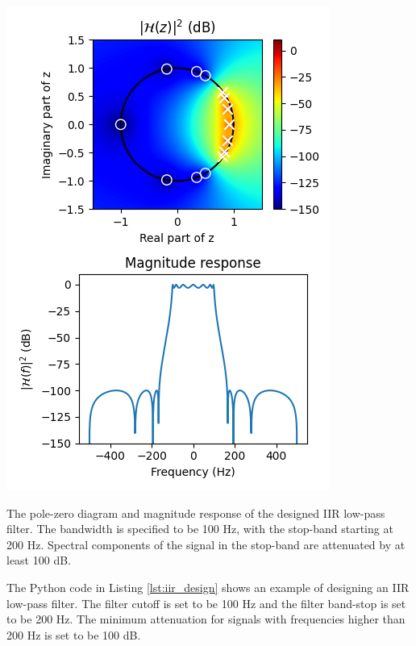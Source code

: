 \begin{marginfigure}
\begin{center}
\includegraphics[width=\textwidth]{code/026_iir/ex_design_lpf.png}
\end{center}
\caption{The pole-zero diagram and magnitude response of the designed IIR low-pass filter. The bandwidth is specified to be 100 Hz, with the stop-band starting at 200 Hz. Spectral components of the signal in the stop-band are attenuated by at least 100 dB.}
\label{fig:iir_lpf_ex_sf}
\end{marginfigure}

The Python code in Listing \ref{lst:iir_design} shows an example of
designing an IIR low-pass filter. The filter cutoff is set to be 100
Hz and the filter band-stop is set to be 200 Hz. The minimum
attenuation for signals with frequencies higher than 200 Hz is set to
be 100 dB.

